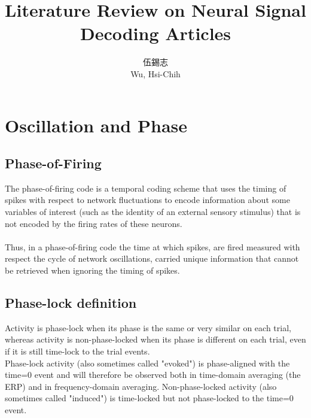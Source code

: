 \documentclass[8pt,a4paper]{article}
\begin{document}

\title{\bf{ Literature Review on Neural Signal Decoding Articles }}
\author{ 伍錫志\\ Wu, Hsi-Chih }
\date{}

\maketitle

\section*{Oscillation and Phase}
\label{sec:Oscillation_and_Phase}


\subsection*{Phase-of-Firing}
The phase-of-firing code is a temporal coding scheme that uses the timing of spikes with respect to network fluctuations to encode information about some variables of interest (such as the identity of an external sensory stimulus) 
that is not encoded by the firing rates of these neurons. \cite{perkel1968}
\\ \\
Thus, in a phase-of-firing code the time at which spikes, are fired measured with respect the cycle of network oscillations, 
carried unique information that cannot be retrieved when ignoring the timing of spikes. \cite{cattani2015}
\\

\subsection*{Phase-lock definition}
Activity is phase-lock when its phase is the same or very similar on each trial, 
whereas activity is non-phase-locked when its phase is different on each trial, 
even if it is still time-lock to the trial events. \cite{cohen2014} \\
Phase-lock activity (also sometimes called "evoked") is phase-aligned with the time=0 event and will 
therefore be observed both in time-domain averaging (the ERP) and in frequency-domain averaging. 
Non-phase-locked activity (also sometimes called "induced") is time-locked but not phase-locked to the time=0 event. \cite{cohen2014}
\\
\end{document}
